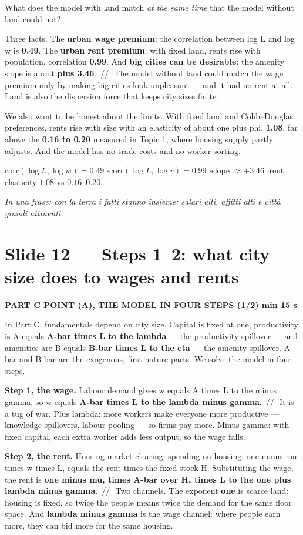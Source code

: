 \documentclass[11pt,a4paper]{article}
\newcommand{\slide}[3]{\Needspace{14\baselineskip}\section{#1}\textcolor{unicared}{\small\bfseries\MakeUppercase{#3}\quad\textperiodcentered\quad #2}\par}
\newcommand{\idea}[1]{\par{\small\itshape\color{unicablue}In una frase: #1}\par}
\newcommand{\pause}{\textcolor{unicared}{\,/\!/\,}}
\begin{document}
\begin{say}
What does the model with land match \emph{at the same time} that the model without land could not?

Three facts. The \textbf{urban wage premium}: the correlation between log L and log w is \textbf{0.49}. The \textbf{urban rent premium}: with fixed land, rents rise with population, correlation \textbf{0.99}. And \textbf{big cities can be desirable}: the amenity slope is about \textbf{plus 3.46}. \pause\ The model without land could match the wage premium only by making big cities look unpleasant --- and it had no rent at all. Land is also the dispersion force that keeps city sizes finite.

We also want to be honest about the limits. With fixed land and Cobb--Douglas preferences, rents rise with size with an elasticity of about one plus phi, \textbf{1.08}, far above the \textbf{0.16 to 0.20} measured in Topic 1, where housing supply partly adjusts. And the model has no trade costs and no worker sorting.
\end{say}

\begin{nums}
corr$(\log L,\log w) = 0.49$ \quad$\cdot$\quad corr$(\log L,\log r) = 0.99$ \quad$\cdot$\quad slope $\approx +3.46$ \quad$\cdot$\quad rent elasticity $1.08$ vs $0.16$--$0.20$.
\end{nums}
\idea{con la terra i fatti stanno insieme: salari alti, affitti alti e città grandi attraenti.}

\slide{Slide 12 --- Steps 1--2: what city size does to wages and rents}{1 min 15 s}{Part C \textperiodcentered{} point (a), the model in four steps (1/2)}

\begin{say}
In Part C, fundamentals depend on city size. Capital is fixed at one, productivity is A equals \textbf{A-bar times L to the lambda} --- the productivity spillover --- and amenities are B equals \textbf{B-bar times L to the eta} --- the amenity spillover. A-bar and B-bar are the exogenous, first-nature parts. We solve the model in four steps.

\textbf{Step 1, the wage.} Labour demand gives w equals A times L to the minus gamma, so w equals \textbf{A-bar times L to the lambda minus gamma}. \pause\ It is a tug of war. Plus lambda: more workers make everyone more productive --- knowledge spillovers, labour pooling --- so firms pay more. Minus gamma: with fixed capital, each extra worker adds less output, so the wage falls.

\textbf{Step 2, the rent.} Housing market clearing: spending on housing, one minus mu times w times L, equals the rent times the fixed stock H. Substituting the wage, the rent is \textbf{one minus mu, times A-bar over H, times L to the one plus lambda minus gamma}. \pause\ Two channels. The exponent \textbf{one} is scarce land: housing is fixed, so twice the people means twice the demand for the same floor space. And \textbf{lambda minus gamma} is the wage channel: where people earn more, they can bid more for the same housing.
\end{say}
\end{document}
